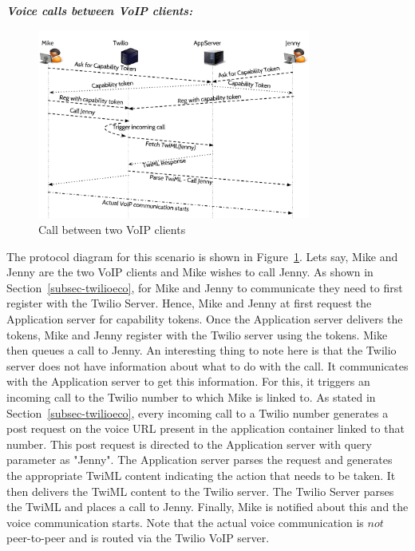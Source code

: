 \emph{\textbf{Voice calls between VoIP clients:} }
\begin{figure}[t!] 
\centering
  \includegraphics[width=0.8\textwidth]{figs/twoclients.pdf}
\caption{Call between two VoIP clients}
\label{fig:2VoIPcall}
\end{figure}
The protocol diagram for this scenario is shown in Figure~\ref{fig:2VoIPcall}. Lets say, Mike and Jenny are the two VoIP clients and Mike wishes to call Jenny. As shown in Section~\ref{subsec-twilioeco}, for Mike and Jenny to communicate they need to first register with the Twilio Server. Hence, Mike and Jenny at first request the Application server for capability tokens. Once the Application server delivers the tokens, Mike and Jenny register with the Twilio server using the tokens. Mike then queues a call to Jenny. An interesting thing to note here is that the Twilio server does not have information about what to do with the call. It communicates with the Application server to get this information. For this, it triggers an incoming call to the Twilio number to which Mike is linked to. As stated in Section~\ref{subsec-twilioeco}, every incoming call to a Twilio number generates a post request on the voice URL present in the application container linked to that number. This post request is directed to the Application server with query parameter as "Jenny". The Application server parses the request and generates the appropriate TwiML content indicating the action that needs to be taken. It then delivers the TwiML content to the Twilio server. The Twilio Server parses the TwiML and places a call to Jenny. Finally, Mike is notified about this and the voice communication starts. Note that the actual voice communication is $not$ peer-to-peer and is routed via the Twilio VoIP server.  

